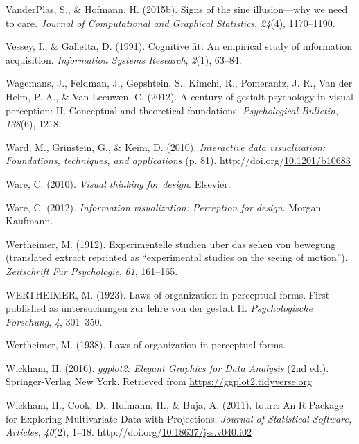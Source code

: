 \documentclass[print]{nuthesis}
\newlength{\cslhangindent}
\newenvironment{CSLReferences}[2]%
{\setlength{\parindent}{0pt}%
\everypar{\setlength{\hangindent}{\cslhangindent}}\ignorespaces}%
{\par}
\begin{document}
\begin{CSLReferences}{1}{0}
\leavevmode{}%
VanderPlas, S., \& Hofmann, H. (2015b). Signs of the sine illusion---why we need to care. \emph{Journal of Computational and Graphical Statistics}, \emph{24}(4), 1170--1190.

\leavevmode{}%
Vessey, I., \& Galletta, D. (1991). Cognitive fit: An empirical study of information acquisition. \emph{Information Systems Research}, \emph{2}(1), 63--84.

\leavevmode{}%
Wagemans, J., Feldman, J., Gepshtein, S., Kimchi, R., Pomerantz, J. R., Van der Helm, P. A., \& Van Leeuwen, C. (2012). A century of gestalt psychology in visual perception: II. Conceptual and theoretical foundations. \emph{Psychological Bulletin}, \emph{138}(6), 1218.

\leavevmode{}%
Ward, M., Grinstein, G., \& Keim, D. (2010). \emph{Interactive data visualization: Foundations, techniques, and applications} (p. 81). http://doi.org/\href{https://doi.org/10.1201/b10683}{10.1201/b10683}

\leavevmode{}%
Ware, C. (2010). \emph{Visual thinking for design}. Elsevier.

\leavevmode{}%
Ware, C. (2012). \emph{Information visualization: Perception for design}. Morgan Kaufmann.

\leavevmode{}%
Wertheimer, M. (1912). Experimentelle studien uber das sehen von bewegung (translated extract reprinted as {``experimental studies on the seeing of motion''}). \emph{Zeitschrift Fur Psychologie}, \emph{61}, 161--165.

\leavevmode{}%
WERTHEIMER, M. (1923). Laws of organization in perceptual forms. First published as untersuchungen zur lehre von der gestalt II. \emph{Psychologische Forschung}, \emph{4}, 301--350.

\leavevmode{}%
Wertheimer, M. (1938). Laws of organization in perceptual forms.

\leavevmode{}%
Wickham, H. (2016). \emph{{ggplot2: Elegant Graphics for Data Analysis}} (2nd ed.). Springer-Verlag New York. Retrieved from \url{https://ggplot2.tidyverse.org}

\leavevmode{}%
Wickham, H., Cook, D., Hofmann, H., \& Buja, A. (2011). {tourr: An R Package for Exploring Multivariate Data with Projections}. \emph{Journal of Statistical Software, Articles}, \emph{40}(2), 1--18. http://doi.org/\href{https://doi.org/10.18637/jss.v040.i02}{10.18637/jss.v040.i02}


\end{CSLReferences}
\end{document}
